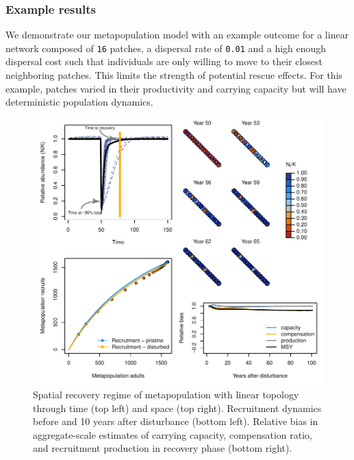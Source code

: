 \documentclass[]{article}
\begin{document}
\hypertarget{example-results}{%
\subsubsection{Example results}\label{example-results}}

We demonstrate our metapopulation model with an example outcome for a
linear network composed of \texttt{16} patches, a dispersal rate of
\texttt{0.01} and a high enough dispersal cost such that individuals are
only willing to move to their closest neighboring patches. This limits
the strength of potential rescue effects. For this example, patches
varied in their productivity and carrying capacity but will have
deterministic population dynamics.

\begin{figure}[H]

{\centering \includegraphics{Managing_for_ecological_surprises_in_metapopulations_files/figure-latex/example results1-1} 

}

\caption{Spatial recovery regime of metapopulation with linear topology through time (top left) and space (top right). Recruitment dynamics before and 10 years after disturbance (bottom left). Relative bias in aggregate-scale estimates of carrying capacity, compensation ratio, and recruitment production in recovery phase (bottom right).}\label{fig:example results1}
\end{figure}
\newpage
\end{document}
